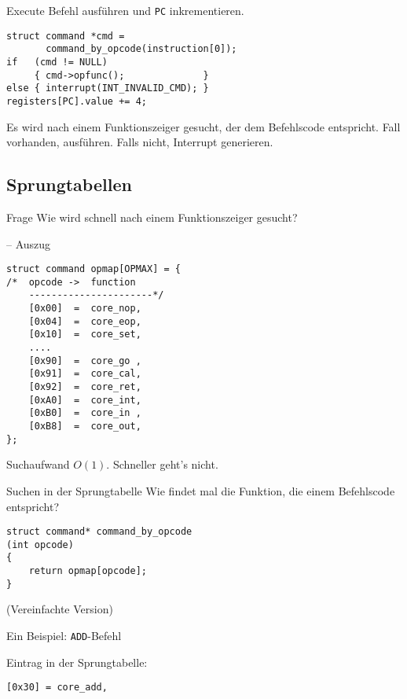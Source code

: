 \begin{frame}[fragile]{Execute}
 Befehl ausführen und \texttt{PC} inkrementieren.
\begin{lstlisting}
struct command *cmd = 
       command_by_opcode(instruction[0]);
if   (cmd != NULL) 
     { cmd->opfunc();              } 
else { interrupt(INT_INVALID_CMD); }
registers[PC].value += 4;
\end{lstlisting}

Es wird nach einem Funktionszeiger gesucht, der dem Befehlscode entspricht.
Fall vorhanden, ausführen. Falls nicht, Interrupt generieren.
\end{frame}


\subsection{Sprungtabellen}

\begin{frame}{Frage}
  Wie wird schnell nach einem Funktionszeiger gesucht?
\end{frame}


\begin{frame}[fragile]{\insertsubsection{} -- Auszug}
\begin{lstlisting}
struct command opmap[OPMAX] = {
/*  opcode ->  function
    ----------------------*/
    [0x00]  =  core_nop,
    [0x04]  =  core_eop,
    [0x10]  =  core_set,
    ....
    [0x90]  =  core_go ,
    [0x91]  =  core_cal,
    [0x92]  =  core_ret,
    [0xA0]  =  core_int,
    [0xB0]  =  core_in ,
    [0xB8]  =  core_out,
};
\end{lstlisting}
Suchaufwand $O(1)$. Schneller geht's nicht.
\end{frame}

\begin{frame}[fragile]{Suchen in der Sprungtabelle}
 Wie findet mal die Funktion, die einem Befehlscode entspricht?
\begin{lstlisting}
struct command* command_by_opcode
(int opcode)
{
    return opmap[opcode];
}
\end{lstlisting}
(Vereinfachte Version)
\end{frame}


\begin{frame}[fragile]{Ein Beispiel: \texttt{ADD}-Befehl}
\begin{center}
  
 \end{center}
 
Eintrag in der Sprungtabelle:
\begin{lstlisting}
[0x30] = core_add,
\end{lstlisting}
\end{frame}


